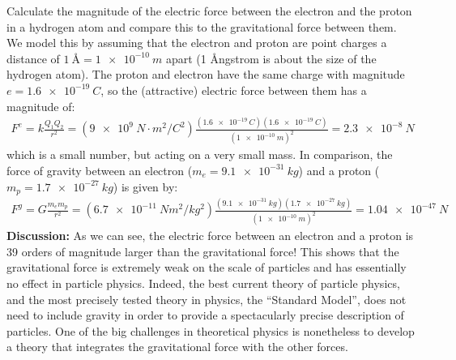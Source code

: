 \begin{example}{Calculate the magnitude of the electric force between the electron and the proton in a hydrogen atom and compare this to the gravitational force between them.}
We model this by assuming that the electron and proton are point charges a distance of $\SI{1}{\angstrom}=\SI{1e-10}{m}$ apart (1 \r Angstrom is about the size of the hydrogen atom). The proton and electron have the same charge with magnitude $e=\SI{1.6e-19}{C}$, so the (attractive) electric force between them has a magnitude of:
\begin{align*}
F^e = k\frac{Q_1Q_2}{r^2}=(\SI{9e9}{N\cdot m^2/C^{2}})\frac{(\SI{1.6e-19}{C})(\SI{1.6e-19}{C})}{(\SI{1e-10}{m})^2}=\SI{2.3e-8}{N}
\end{align*}
which is a small number, but acting on a very small mass. In comparison, the force of gravity between an electron ($m_e=\SI{9.1e-31}{kg}$) and a proton ($m_p=\SI{1.7e-27}{kg}$) is given by:
\begin{align*}
F^g=G\frac{m_em_p}{r^2}=(\SI{6.7e-11}{Nm^2/kg^2})\frac{(\SI{9.1e-31}{kg})(\SI{1.7e-27}{kg})}{(\SI{1e-10}{m})^2}=\SI{1.04e-47}{N}
\end{align*}
\textbf{Discussion:} As we can see, the electric force between an electron and a proton is 39 orders of magnitude larger than the gravitational force! This shows that the gravitational force is extremely weak on the scale of particles and has essentially no effect in particle physics. Indeed, the best current theory of particle physics, and the most precisely tested theory in physics, the ``Standard Model'', does not need to include gravity in order to provide a spectacularly precise description of particles. One of the big challenges in theoretical physics is nonetheless to develop a theory that integrates the gravitational force with the other forces.
\end{example}
